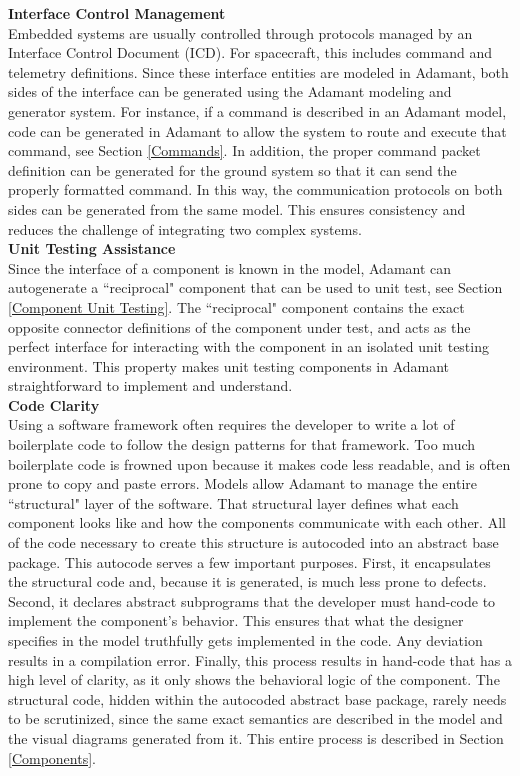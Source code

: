 \textbf{Interface Control Management} \\

Embedded systems are usually controlled through protocols managed by an Interface Control Document (ICD). For spacecraft, this includes command and telemetry definitions. Since these interface entities are modeled in Adamant, both sides of the interface can be generated using the Adamant modeling and generator system. For instance, if a command is described in an Adamant model, code can be generated in Adamant to allow the system to route and execute that command, see Section \ref{Commands}. In addition, the proper command packet definition can be generated for the ground system so that it can send the properly formatted command. In this way, the communication protocols on both sides can be generated from the same model. This ensures consistency and reduces the challenge of integrating two complex systems. \\

\textbf{Unit Testing Assistance} \\

Since the interface of a component is known in the model, Adamant can autogenerate a ``reciprocal" component that can be used to unit test, see Section \ref{Component Unit Testing}. The ``reciprocal" component contains the exact opposite connector definitions of the component under test, and acts as the perfect interface for interacting with the component in an isolated unit testing environment. This property makes unit testing components in Adamant straightforward to implement and understand. \\

\textbf{Code Clarity} \\

Using a software framework often requires the developer to write a lot of boilerplate code to follow the design patterns for that framework. Too much boilerplate code is frowned upon because it makes code less readable, and is often prone to copy and paste errors. Models allow Adamant to manage the entire ``structural" layer of the software. That structural layer defines what each component looks like and how the components communicate with each other. All of the code necessary to create this structure is autocoded into an abstract base package. This autocode serves a few important purposes. First, it encapsulates the structural code and, because it is generated, is much less prone to defects. Second, it declares abstract subprograms that the developer must hand-code to implement the component's behavior. This ensures that what the designer specifies in the model truthfully gets implemented in the code. Any deviation results in a compilation error. Finally, this process results in hand-code that has a high level of clarity, as it only shows the behavioral logic of the component. The structural code, hidden within the autocoded abstract base package, rarely needs to be scrutinized, since the same exact semantics are described in the model and the visual diagrams generated from it. This entire process is described in Section \ref{Components}.

